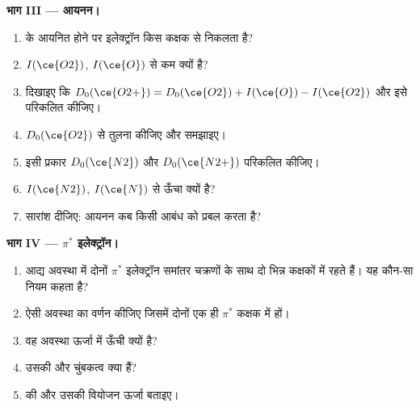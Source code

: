\begin{problem}
\medskip
\noindent\textbf{भाग III --- आयनन।}
\begin{enumerate}[resume]
  \item {} के आयनित होने पर इलेक्ट्रॉन किस कक्षक से निकलता है?
  \item $I(\ce{O2})$, $I(\ce{O})$ से कम क्यों है?
  \item दिखाइए कि $D_0(\ce{O2+}) = D_0(\ce{O2}) + I(\ce{O}) - I(\ce{O2})$ और इसे परिकलित कीजिए।
  \item $D_0(\ce{O2})$ से तुलना कीजिए और समझाइए।
  \item इसी प्रकार $D_0(\ce{N2})$ और $D_0(\ce{N2+})$ परिकलित कीजिए।
  \item $I(\ce{N2})$, $I(\ce{N})$ से ऊँचा क्यों है?
  \item सारांश दीजिए: आयनन कब किसी आबंध को प्रबल करता है?
\end{enumerate}

\medskip
\noindent\textbf{भाग IV --- $\pi^*$ इलेक्ट्रॉन।}
\begin{enumerate}[resume]
  \item आद्य अवस्था में दोनों $\pi^*$ इलेक्ट्रॉन समांतर चक्रणों के साथ दो भिन्न कक्षकों में
        रहते हैं। यह कौन-सा नियम कहता है?
  \item ऐसी अवस्था का वर्णन कीजिए जिसमें दोनों एक ही $\pi^*$ कक्षक में हों।
  \item वह अवस्था ऊर्जा में ऊँची क्यों है?
  \item उसकी  और चुंबकत्व क्या हैं?
  \item {} की  और उसकी वियोजन ऊर्जा बताइए।
\end{enumerate}
\end{problem}
